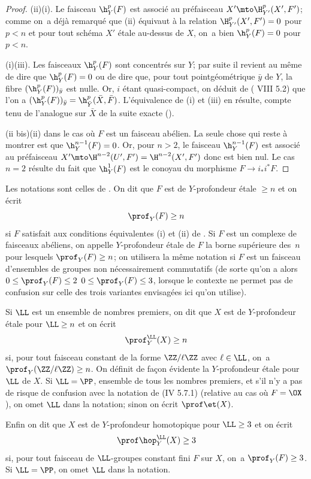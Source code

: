 \begin{proof}
\textup{(ii)}\ALORS \textup{(i)}. Le faisceau ${\h}_Y^p(F)$ est associ\'e au pr\'efaisceau $X'\mto \H_{Y'}^p(X', F')$; comme on~a d\'ej\`a remarqu\'e que \textup{(ii)} \'equivaut \`a la relation $\H_{Y'}^p(X', F')=0$ pour $p<n$ et pour tout sch\'ema $X'$ \'etale au-dessus de $X$, on~a bien ${\h}_Y^p(F)=0$ pour $p<n$.

\textup{(i)}\SSI \textup{(iii)}. Les faisceaux ${\h}_Y^p(F)$ sont concentr\'es sur $Y$; par suite il revient au m\^eme de dire que ${\h}_Y^p(F)=0$ ou de dire que, pour tout point\pageoriginale g\'eom\'etrique $\bar y$ de $Y$, la fibre $({\h}_Y^p(F))_{\bar y}$ est nulle. Or, $i$ \'etant quasi-compact, on d\'eduit de ( VIII 5.2) que l'on a $({\h}_Y^p(F))_{\bar y}={\h}_{\bar Y}^p(\bar X, \bar F)$. L'\'equivalence de \textup{(i)} et \textup{(iii)} en r\'esulte, compte tenu de l'analogue sur $\bar X$ de la suite exacte ().

(ii bis)\ALORS \textup{(ii)} dans le cas o\`u $F$ est un faisceau ab\'elien. La seule chose qui reste \`a montrer est que ${\h}_Y^{n-1}(F)=0$. Or, pour $n>2$, le faisceau ${\h}_Y^{n-1}(F)$ est associ\'e au pr\'efaisceau $X'\mto \H^{n-2}(U', F')=\H^{n-2}(X', F')$ donc est bien nul. Le cas $n=2$ r\'esulte du fait que ${\h}_Y^1(F)$ est le conoyau du morphisme $F\to i_*i^*F$.
\skipqed
\end{proof}

\begin{definition} \label{XIV.1.2}
Les notations sont celles de . On dit que $F$ est de $Y$-profondeur \'etale $\geq n$ et on \'ecrit
$$
\prof_Y(F)\geq n$$
si $F$ satisfait aux conditions \'equivalentes \textup{(i)} et \textup{(ii)} de . Si $F$ est un complexe de faisceaux ab\'eliens, on appelle $Y$-profondeur \'etale de $F$ la borne sup\'erieure des~$n$ pour lesquels $\prof_Y(F)\geq n$; on utilisera la m\^eme notation si $F$ est un faisceau d'ensembles \resp de groupes non n\'ecessairement commutatifs (de sorte qu'on a alors $0\leq \prof_Y(F)\leq 2$ \resp $0\leq \prof_Y(F)\leq 3$, lorsque le contexte ne permet pas de confusion sur celle des trois variantes envisag\'ees ici qu'on utilise).

Si $\LL$ est un ensemble de nombres premiers, on dit que $X$ est de $Y$-profondeur \'etale pour $\LL \geq n$ et on \'ecrit
$$
\prof_Y^{\LL}(X)\geq n
$$
si, pour tout faisceau constant de la forme $\ZZ/\ell\ZZ$ avec $\ell\in \LL$, on~a $\prof_Y(\ZZ/\ell\ZZ)\geq n$\pageoriginale. On d\'efinit de fa\c con \'evidente la $Y$-profondeur \'etale pour $\LL$ de $X$. Si $\LL=\PP$, ensemble de tous les nombres premiers, et s'il n'y a pas de risque de confusion avec la notation de \textup{(\EGA IV 5.7.1)} (relative au cas o\`u $F=\OX$), on omet $\LL$ dans la notation; sinon on \'ecrit $\prof \et(X)$.

Enfin on dit que $X$ est de $Y$-profondeur homotopique \ignorespaces pour $\LL \geq 3$ et on \'ecrit
$$
\prof \hop_Y^{\LL}(X)\geq 3$$
si, pour tout faisceau de $\LL$-groupes constant fini $F$ sur $X$, on~a $\prof_Y(F)\geq 3$. Si $\LL=\PP$, on omet $\LL$ dans la notation.
\end{definition}


